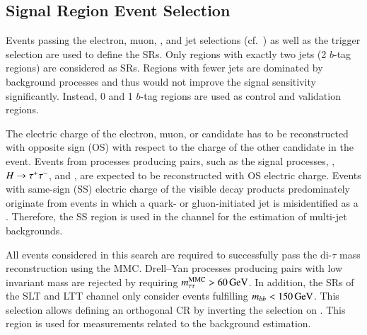 



\subsection{Signal Region Event Selection}%
\label{sec:sr_and_cr_selection}

Events passing the electron, muon, \tauhadvis, and jet selections
(cf.~) as well as the trigger selection are used to
define the SRs. Only regions with exactly two \btagged jets (2 $b$-tag regions)
are considered as SRs. Regions with fewer \btagged jets are dominated by
background processes and thus would not improve the signal sensitivity
significantly. Instead, 0 and 1 $b$-tag regions are used as control and
validation regions.

The electric charge of the electron, muon, or \tauhadvis candidate has to be
reconstructed with opposite sign (OS) with respect to the charge of the other
\tauhadvis candidate in the event. Events from processes producing \taulepton
pairs, such as the signal processes, \Zjets, $H \to \tau^{+} \tau^{-}$, and \ttbar, are
expected to be reconstructed with OS electric charge. Events with same-sign (SS)
electric charge of the visible \taulepton decay products predominately originate
from events in which a quark- or gluon-initiated jet is misidentified as a
\tauhadvis. Therefore, the SS region is used in the \hadhad channel for the
estimation of multi-jet backgrounds.

All events considered in this search are required to successfully pass the
di-$\tau$ mass reconstruction using the MMC. Drell--Yan processes producing
\taulepton pairs with low invariant mass are rejected by requiring
$m_{\tau\tau}^\text{MMC} > \SI{60}{\ensuremath{\text{GeV}}}$. In addition, the SRs of the \lephad SLT and LTT channel
only consider events fulfilling $m_{bb} < \SI{150}{\ensuremath{\text{GeV}}}$. This selection allows
defining an orthogonal \ttbar CR by inverting the selection on \mBB. This region
is used for measurements related to the \faketauhadvis background estimation.

